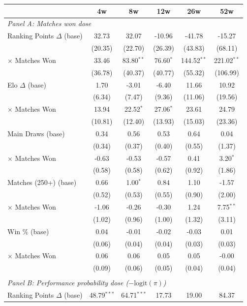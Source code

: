 \begin{tabular}{lccccc}
\toprule
 & 4w & 8w & 12w & 26w & 52w \\
\midrule
\multicolumn{6}{l}{\textit{Panel A: Matches won dose}} \\
\quad Ranking Points $\Delta$ (base) & 32.73 & 32.07 & -10.96 & -41.78 & -15.27 \\
 & (20.35) & (22.70) & (26.39) & (43.83) & (68.11) \\
\quad \quad $\times$ Matches Won & 33.46 & 83.80$^{**}$ & 76.60$^{*}$ & 144.52$^{**}$ & 221.02$^{**}$ \\
 & (36.78) & (40.37) & (40.77) & (55.32) & (106.99) \\[0.3em]
\quad Elo $\Delta$ (base) & 1.70 & -3.01 & -6.40 & 11.66 & 10.92 \\
 & (6.34) & (7.47) & (9.36) & (11.06) & (19.56) \\
\quad \quad $\times$ Matches Won & 13.94 & 22.52$^{*}$ & 27.06$^{*}$ & 23.61 & 24.79 \\
 & (10.81) & (12.40) & (13.93) & (15.03) & (23.36) \\[0.3em]
\quad Main Draws (base) & 0.34 & 0.56 & 0.53 & 0.64 & 0.04 \\
 & (0.34) & (0.37) & (0.40) & (0.55) & (1.37) \\
\quad \quad $\times$ Matches Won & -0.63 & -0.53 & -0.57 & 0.41 & 3.20$^{*}$ \\
 & (0.58) & (0.58) & (0.62) & (0.92) & (1.86) \\[0.3em]
\quad Matches (250+) (base) & 0.66 & 1.00$^{*}$ & 0.84 & 1.10 & -1.57 \\
 & (0.52) & (0.53) & (0.55) & (0.90) & (2.00) \\
\quad \quad $\times$ Matches Won & -1.06 & -0.26 & -0.30 & 1.24 & 7.75$^{**}$ \\
 & (1.02) & (0.96) & (1.00) & (1.32) & (3.11) \\[0.3em]
\quad Win \% (base) & 0.04 & -0.01 & -0.02 & -0.03 & 0.01 \\
 & (0.06) & (0.04) & (0.04) & (0.03) & (0.03) \\
\quad \quad $\times$ Matches Won & 0.06 & 0.06 & 0.05 & 0.05 & -0.00 \\
 & (0.09) & (0.06) & (0.05) & (0.04) & (0.04) \\[0.3em]
\\[0.5em]
\multicolumn{6}{l}{\textit{Panel B: Performance probability dose ($-\text{logit}(\pi)$)}} \\
\quad Ranking Points $\Delta$ (base) & 48.79$^{***}$ & 64.71$^{***}$ & 17.73 & 19.00 & 84.37 \\

\end{tabular}
